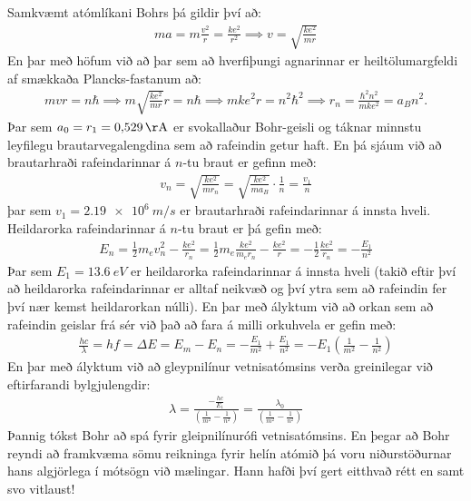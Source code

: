 Samkvæmt atómlíkani Bohrs þá gildir því að:
\begin{align*}
    m a = m \frac{v^2}{r} = \frac{ke^2}{r^2} \implies v = \sqrt{\frac{ke^2}{m r}}
\end{align*}
En þar með höfum við að þar sem að hverfiþungi agnarinnar er heiltölumargfeldi af smækkaða Plancks-fastanum að:
\begin{align*}
    mvr = n\hbar \implies m \sqrt{\frac{ke^2}{mr}} r = n \hbar \implies mke^2 r = n^2 \hbar^2 \implies r_n = \frac{\hbar^2 n^2}{mke^2} = a_B n^2.
\end{align*}
Þar sem $a_0 = r_1 = \SI{0.529}{\AA}$ er svokallaður Bohr-geisli og táknar minnstu leyfilegu brautarvegalengdina sem að rafeindin getur haft. En þá sjáum við að brautarhraði rafeindarinnar á $n$-tu braut er gefinn með:
\begin{align*}
    v_n = \sqrt{\frac{ke^2}{mr_n}} = \sqrt{\frac{ke^2}{ma_B}} \cdot \frac{1}{n} = \frac{v_1}{n} 
\end{align*}
þar sem $v_1 = \SI{2.19e6}{m/s}$ er brautarhraði rafeindarinnar á innsta hveli. Heildarorka rafeindarinnar á $n$-tu braut er þá gefin með:
\begin{align*}
    E_n = \frac{1}{2}m_ev_n^2  - \frac{ke^2}{r_n} = \frac{1}{2} m_e \frac{ke^2}{m_e r_n} - \frac{ke^2}{r} = -\frac{1}{2} \frac{ke^2}{r_n} = -\frac{E_1}{n^2}
\end{align*}
Þar sem $E_1 = \SI{13.6}{eV}$ er heildarorka rafeindarinnar á innsta hveli (takið eftir því að heildarorka rafeindarinnar er alltaf neikvæð og því ytra sem að rafeindin fer því nær kemst heildarorkan núlli). En þar með ályktum við að orkan sem að rafeindin geislar frá sér við það að fara á milli orkuhvela er gefin með:
\begin{align*}
    \frac{hc}{\lambda} = hf = \Delta E = E_m - E_n = -\frac{E_1}{m^2} + \frac{E_1}{n^2} = -E_1 \left( \frac{1}{m^2} - \frac{1}{n^2} \right)
\end{align*}
En þar með ályktum við að gleypnilínur vetnisatómsins verða greinilegar við eftirfarandi bylgjulengdir:
\begin{align*}
    \lambda = \frac{-\frac{hc}{E_1}}{\left( \frac{1}{m^2} - \frac{1}{n^2} \right)} = \frac{\lambda_0}{\left( \frac{1}{m^2} - \frac{1}{n^2} \right)}
\end{align*}
Þannig tókst Bohr að spá fyrir gleipnilínurófi vetnisatómsins. En þegar að Bohr reyndi að framkvæma sömu reikninga fyrir helín atómið þá voru niðurstöðurnar hans algjörlega í mótsögn við mælingar. Hann hafði því gert eitthvað rétt en samt svo vitlaust!



